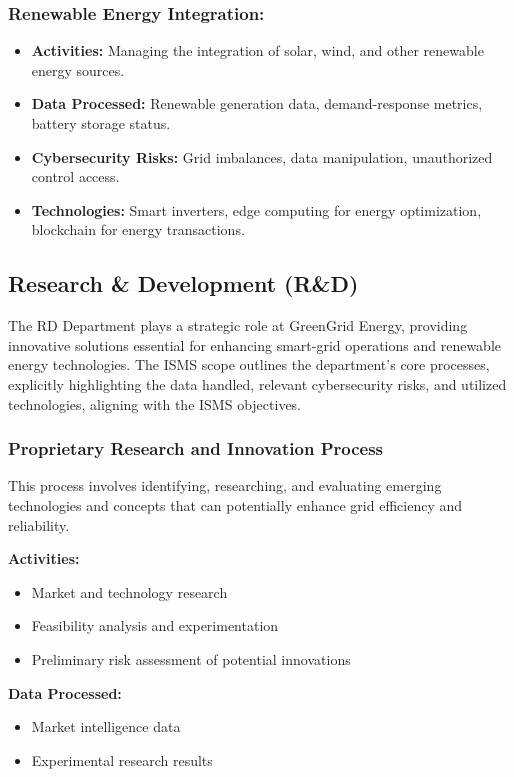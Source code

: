 \subsubsection{Renewable Energy Integration:}

\begin{itemize}
    \item \textbf{Activities:} Managing the integration of solar, wind, and other renewable energy sources.
    \item \textbf{Data Processed:} Renewable generation data, demand-response metrics, battery storage status.
    \item \textbf{Cybersecurity Risks:} Grid imbalances, data manipulation, unauthorized control access.
    \item \textbf{Technologies:} Smart inverters, edge computing for energy optimization, blockchain for energy transactions.
\end{itemize}

\subsection{Research \& Development (R\&D)}

The \ac{RD} Department plays a strategic role at GreenGrid Energy, providing innovative solutions essential for enhancing smart-grid operations and renewable energy technologies. The \ac{ISMS} scope outlines the department’s core processes, explicitly highlighting the data handled, relevant cybersecurity risks, and utilized technologies, aligning with the \ac{ISMS} objectives.

\subsubsection{Proprietary Research and Innovation Process}

This process involves identifying, researching, and evaluating emerging technologies and concepts that can potentially enhance grid efficiency and reliability.

\textbf{Activities:}
\begin{itemize}
    \item Market and technology research
    \item Feasibility analysis and experimentation
    \item Preliminary risk assessment of potential innovations
\end{itemize}

\textbf{Data Processed:}
\begin{itemize}
    \item Market intelligence data
    \item Experimental research results
\end{itemize}


